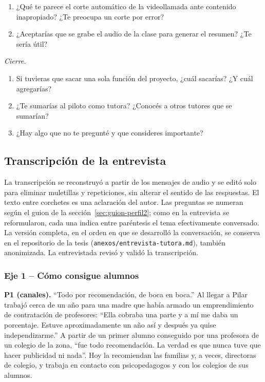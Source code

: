 \begin{enumerate}[resume]
    \item ¿Qué te parece el corte automático de la videollamada ante
          contenido inapropiado? ¿Te preocupa un corte por error?
    \item ¿Aceptarías que se grabe el audio de la clase para generar el
          resumen? ¿Te sería útil?
\end{enumerate}

\emph{Cierre.}

\begin{enumerate}[resume]
    \item Si tuvieras que sacar una sola función del proyecto, ¿cuál
          sacarías? ¿Y cuál agregarías?
    \item ¿Te sumarías al piloto como tutora? ¿Conocés a otros tutores que
          se sumarían?
    \item ¿Hay algo que no te pregunté y que consideres importante?
\end{enumerate}

\subsection{Transcripción de la entrevista}

La transcripción se reconstruyó a partir de los mensajes de audio y se
editó solo para eliminar muletillas y repeticiones, sin alterar el
sentido de las respuestas. El texto entre corchetes es una aclaración
del autor. Las preguntas se numeran según el guion de la
sección~\ref{sec:guion-perfil2}; como en la entrevista se reformularon,
cada una indica entre paréntesis el tema efectivamente conversado. La
versión completa, en el orden en que se desarrolló la conversación, se
conserva en el repositorio de la tesis
(\texttt{anexos/entrevista-tutora.md}), también anonimizada. La
entrevistada revisó y validó la transcripción.

\subsubsection*{Eje 1 -- Cómo consigue alumnos}

\textbf{P1 (canales).} ``Todo por recomendación, de boca en boca.'' Al
llegar a Pilar trabajó cerca de un año para una madre que había armado
un emprendimiento de contratación de profesores: ``Ella cobraba una
parte y a mí me daba un porcentaje. Estuve aproximadamente un año así y
después ya quise independizarme.'' A partir de un primer alumno
conseguido por una profesora de un colegio de la zona, ``fue todo
recomendación. La verdad es que nunca tuve que hacer publicidad ni
nada''. Hoy la recomiendan las familias y, a veces, directoras de
colegio, y trabaja en contacto con psicopedagogos y con los colegios de
sus alumnos.

